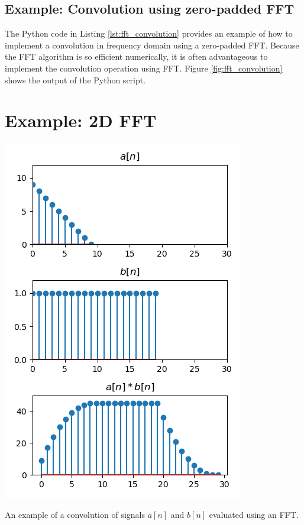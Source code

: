 \subsection{Example: Convolution using zero-padded FFT}

The Python code in Listing \ref{lst:fft_convolution} provides an
example of how to implement a convolution in frequency domain using a
zero-padded FFT. Because the FFT algorithm is so efficient
numerically, it is often advantageous to implement the convolution
operation using FFT. Figure \ref{fig:fft_convolution} shows the output
of the Python script.



\section{Example: 2D FFT}

\begin{marginfigure}
\begin{center}
\includegraphics[width=\textwidth]{code/021_fft_convolution/convolution.png}
\end{center}
\caption{An example of a convolution of signals $a[n]$ and $b[n]$ evaluated using an FFT.}
\label{fig:fft_convolution}
\end{marginfigure}


